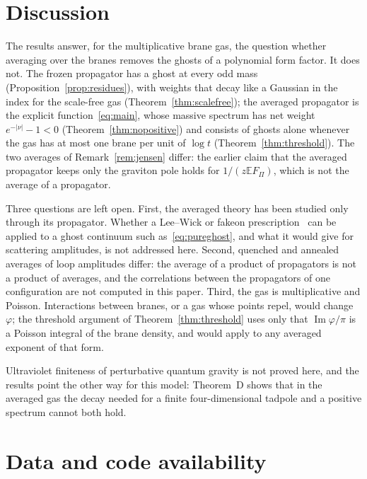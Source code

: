 \documentclass[aps,prd,twocolumn,superscriptaddress,nofootinbib,longbibliography,floatfix,amsmath,amssymb,10pt]{revtex4-2}
\theoremstyle{definition}
\theoremstyle{remark}
\newcommand{\E}{\mathbb{E}}
\DeclareMathOperator{\im}{Im}
\begin{document}
\section{Discussion}\label{sec:discussion}

The results answer, for the multiplicative brane gas, the question whether
averaging over the branes removes the ghosts of a polynomial form factor. It
does not. The frozen propagator has a ghost at every odd mass
(Proposition~\ref{prop:residues}), with weights that decay like a Gaussian in
the index for the scale-free gas (Theorem~\ref{thm:scalefree}); the averaged
propagator is the explicit function~\eqref{eq:main}, whose massive spectrum
has net weight $e^{-|\nu|}-1<0$ (Theorem~\ref{thm:nopositive}) and consists
of ghosts alone whenever the gas has at most one brane per unit of $\log t$
(Theorem~\ref{thm:threshold}). The two averages of Remark~\ref{rem:jensen}
differ: the earlier claim that the averaged propagator keeps only the
graviton pole holds for $1/(z\E F_\Pi)$, which is not the average of a
propagator.

Three questions are left open. First, the averaged theory has been studied
only through its propagator. Whether a Lee--Wick or fakeon
prescription~\cite{LeeWick1969,AnselmiPiva2017} can be applied to a ghost
continuum such as~\eqref{eq:pureghost}, and what it would give for scattering
amplitudes, is not addressed here. Second, quenched and annealed averages of
loop amplitudes differ: the average of a product of propagators is not a
product of averages, and the correlations between the propagators of one
configuration are not computed in this paper. Third, the gas is
multiplicative and Poisson. Interactions between branes, or a gas whose
points repel, would change $\varphi$; the threshold argument of
Theorem~\ref{thm:threshold} uses only that $\im\varphi/\pi$ is a Poisson
integral of the brane density, and would apply to any averaged exponent of
that form.

Ultraviolet finiteness of perturbative quantum gravity is not proved here,
and the results point the other way for this model: Theorem~D shows that in
the averaged gas the decay needed for a finite four-dimensional tadpole and a
positive spectrum cannot both hold.

\section*{Data and code availability}
\end{document}
